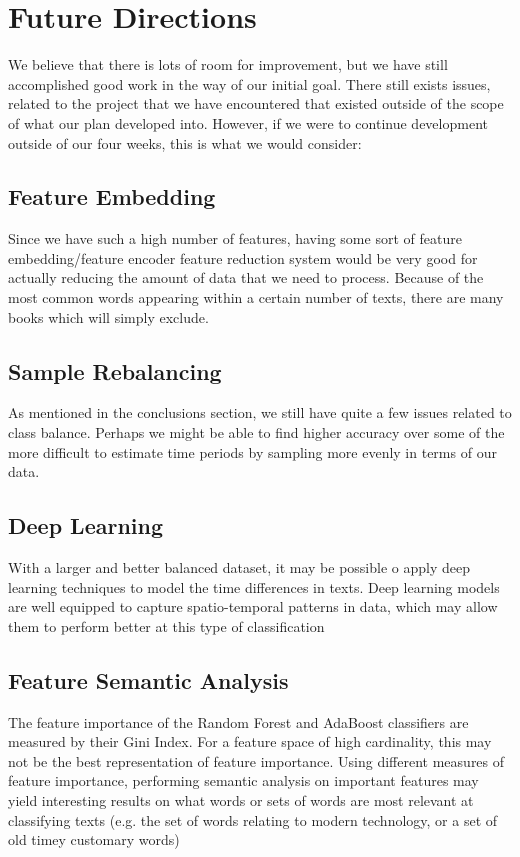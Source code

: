 \documentclass{article}
\begin{document}
\section{Future Directions}

We believe that there is lots of room for improvement, but we have still accomplished 
good work in the way of our initial goal. There still exists issues, related to the project
that we have encountered that existed outside of the scope of what our plan developed into.
However, if we were to continue development outside of our four weeks, this is what we would 
consider:

\subsection{Feature Embedding}
Since we have such a high number of features, having some sort of feature embedding/feature
encoder feature reduction system would be very good for actually reducing the amount of 
data that we need to process. Because of the most common words appearing within a certain 
number of texts, there are many books which will simply exclude.

\subsection{Sample Rebalancing}
As mentioned in the conclusions section, we still have quite a few issues related to class 
balance. Perhaps we might be able to find higher accuracy over some of the more difficult to 
estimate time periods by sampling more evenly in terms of our data.

\subsection{Deep Learning}
With a larger and better balanced dataset, it may be possible o apply deep learning techniques
to model the time differences in texts. Deep learning models are well equipped to capture
spatio-temporal patterns in data, which may allow them to perform better at this type of
classification

\subsection{Feature Semantic Analysis}
The feature importance of the Random Forest and AdaBoost classifiers are measured by their Gini Index.
For a feature space of high cardinality, this may not be the best representation of feature importance.
Using different measures of feature importance, performing semantic analysis on important features may 
yield interesting results on what words or sets of words are most relevant at classifying texts
(e.g. the set of words relating to modern technology, or a set of old timey customary words)
\end{document}
